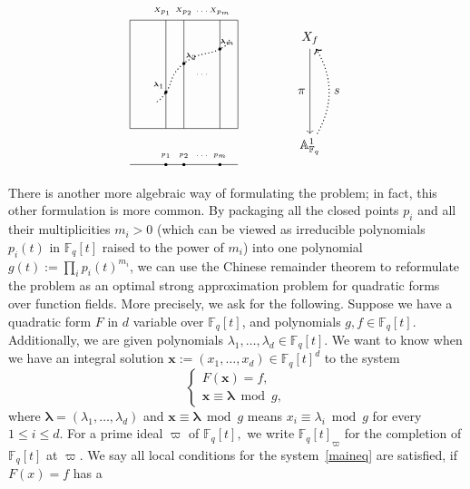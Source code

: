 \documentclass[11pt]{amsart}
\theoremstyle{plain}
\theoremstyle{plain}
\renewcommand{\vec}[1]{\mathbf{#1}}
\theoremstyle{remark}
\theoremstyle{definition}
\begin{document}
\[\begin{tikzpicture}

\draw (0,0) rectangle (3,3);
\node (A) at (5,2.5) {$X_f$};
\draw (0,-1)--(3,-1);
\node (B) at (5,-0.5) {$\mathbb{A}^1_{\mathbb{F}_q}$};
\draw [->] (A) to node[left]{$\pi$} (B);
\draw [bend right, ->, dotted, thick] (B) to node[right]{$s$}(A);
\draw (1,-0.75) node{\tiny $p_1$};
\draw (1.5,-0.75) node{\tiny $p_2$};
\draw (2,-0.75) node{\tiny $\hdots$};
\draw (2.5,-0.75) node{\tiny $p_m$};
\draw (1,-1) node{\tiny $\bullet$};
\draw (1.5,-1) node{\tiny $\bullet$};
\draw (2.5,-1) node{\tiny $\bullet$};
\draw (1,0)--(1,3);
\draw (1.5,0)--(1.5,3);
\draw (2.5,0)--(2.5,3);
\draw (2,1.5) node{\tiny $\hdots$};
\draw (0.8,1.2) node{\tiny $\boldsymbol{\lambda}_1$};
\draw (1.7,2) node{\tiny $\boldsymbol{\lambda}_2$};
\draw (2.7,2.4) node{\tiny $\boldsymbol{\lambda}_m$};
\draw (1,1) node{\tiny $\bullet$};
\draw (1.5,1.8) node{\tiny $\bullet$};
\draw (2.5,2.2) node{\tiny $\bullet$};

\draw [thick, dotted] plot [smooth, tension=1] coordinates { (0.75,0.75) (1,1) (1.5,1.8) (2.5,2.2) (2.75,2.45)};

\draw (0.9,3.25) node{\tiny $X_{p_1}$};
\draw (1.5,3.25) node{\tiny $X_{p_2}$};
\draw (2,3.25) node{\tiny $\hdots$};
\draw (2.5,3.25) node{\tiny $X_{p_m}$};
\end{tikzpicture}\]
There is another more algebraic way of formulating the problem; in fact, this other formulation is more common. By packaging all the closed points $p_i$ and all their multiplicities $m_i>0$ (which can be viewed as irreducible polynomials $p_i(t)$ in $\mathbb{F}_q[t]$ raised to the power of $m_i$) into one polynomial $g(t):=\prod_ip_i(t)^{m_i}$, we can use the Chinese remainder theorem to reformulate the problem as an optimal strong approximation problem for quadratic forms over function fields. More precisely, we ask for the following. Suppose we have a quadratic form $F$ in $d$ variable over $\mathbb{F}_q[t]$, and polynomials $g,f\in\mathbb{F}_q[t]$. Additionally, we are given polynomials $\lambda_1,\hdots,\lambda_d\in\mathbb{F}_q[t]$. We want to know when we have an integral solution $\vec{x}:=(x_1,\dots,x_d)\in \mathbb{F}_q[t]^d $ to the system
\begin{equation}\label{maineq}\begin{cases}F(\vec{x})=f,\\ \vec{x}\equiv\boldsymbol{\lambda}\bmod g,\end{cases}\end{equation}
where $\boldsymbol{\lambda}=(\lambda_1,\dots,\lambda_d)$ and $\vec{x}\equiv\boldsymbol{\lambda}\bmod g$ means $x_i\equiv \lambda_i\bmod g$ for every $1\leq i\leq d$. For a prime ideal $\varpi$  of  ${\mathbb{F}_q[t]},$ we write ${\mathbb{F}_q[t]}_{\varpi}$ for the completion of $\mathbb{F}_q[t]$ at $\varpi$. We say all local conditions for the system~\eqref{maineq} are satisfied, if $F(x) = f$ has a
\end{document}
